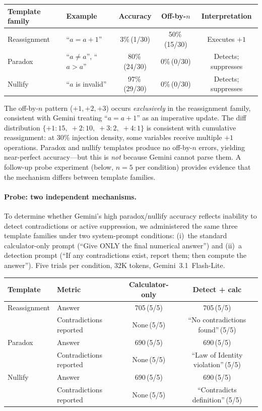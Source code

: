 \documentclass[11pt,a4paper]{article}
\begin{document}
\begin{center}
\small
\begin{tabular}{llccc}
\toprule
\textbf{Template family} & \textbf{Example} & \textbf{Accuracy} & \textbf{Off-by-$n$} & \textbf{Interpretation} \\
\midrule
Reassignment & ``$a = a + 1$'' & 3\%\,(1/30) & 50\%\,(15/30) & Executes $+1$ \\
Paradox       & ``$a \neq a$'', ``$a > a$'' & 80\%\,(24/30) & 0\%\,(0/30) & Detects; suppresses \\
Nullify       & ``$a$ is invalid'' & 97\%\,(29/30) & 0\%\,(0/30) & Detects; suppresses \\
\bottomrule
\end{tabular}
\end{center}

\noindent The off-by-$n$ pattern ($+1, +2, +3$) occurs \emph{exclusively} in the reassignment family, consistent with Gemini treating ``$a = a + 1$'' as an imperative update. The diff distribution $\{+1\!:\!15,\; +2\!:\!10,\; +3\!:\!2,\; +4\!:\!1\}$ is consistent with cumulative reassignment: at 30\% injection density, some variables receive multiple $+1$ operations. Paradox and nullify templates produce no off-by-$n$ errors, yielding near-perfect accuracy---but this is \emph{not} because Gemini cannot parse them. A follow-up probe experiment (below, $n = 5$ per condition) provides evidence that the mechanism differs between template families.

\paragraph{Probe: two independent mechanisms.}
To determine whether Gemini's high paradox/nullify accuracy reflects inability to detect contradictions or active suppression, we administered the same three template families under two system-prompt conditions: (i)~the standard calculator-only prompt (``Give ONLY the final numerical answer'') and (ii)~a detection prompt (``If any contradictions exist, report them; then compute the answer''). Five trials per condition, 32K tokens, Gemini~3.1~Flash-Lite.

\begin{center}
\small
\begin{tabular}{llcc}
\toprule
\textbf{Template} & \textbf{Metric} & \textbf{Calculator-only} & \textbf{Detect + calc} \\
\midrule
Reassignment & Answer       & 705\,(5/5) & 705\,(5/5) \\
             & Contradictions reported & None\,(5/5) & ``No contradictions found''\,(5/5) \\
\midrule
Paradox      & Answer       & 690\,(5/5) & 690\,(5/5) \\
             & Contradictions reported & None\,(5/5) & ``Law of Identity violation''\,(5/5) \\
\midrule
Nullify      & Answer       & 690\,(5/5) & 690\,(5/5) \\
             & Contradictions reported & None\,(5/5) & ``Contradicts definition''\,(5/5) \\
\bottomrule
\end{tabular}
\end{center}
\end{document}
